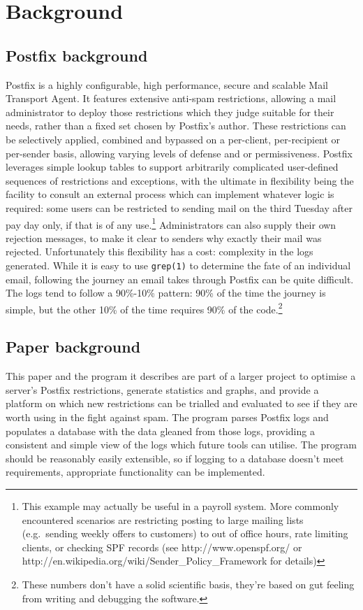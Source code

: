 \documentclass[a4paper,12pt,draft]{article}
\begin{document}
\section{Background}

\subsection{Postfix background}

Postfix is a highly configurable, high performance, secure and scalable
Mail Transport Agent.  It features extensive anti-spam restrictions,
allowing a mail administrator to deploy those restrictions which they judge
suitable for their needs, rather than a fixed set chosen by Postfix's
author.  These restrictions can be selectively applied, combined and
bypassed on a per-client, per-recipient or per-sender basis, allowing
varying levels of defense and or permissiveness.  Postfix leverages simple
lookup tables to support arbitrarily complicated user-defined sequences of
restrictions and exceptions, with the ultimate in flexibility being the
facility to consult an external process which can implement whatever logic
is required: some users can be restricted to sending mail on the third
Tuesday after pay day only, if that is of any use.\footnote{This example
may actually be useful in a payroll system.  More commonly encountered
scenarios are restricting posting to large mailing lists (e.g.\ sending
weekly offers to customers) to out of office hours, rate limiting clients,
or checking SPF records (see http://www.openspf.org/ or
http://en.wikipedia.org/wiki/Sender\_Policy\_Framework for details)}
Administrators can also supply their own rejection messages, to make it
clear to senders why exactly their mail was rejected.  Unfortunately this
flexibility has a cost: complexity in the logs generated.  While it is easy
to use \texttt{grep(1)} to determine the fate of an individual email,
following the journey an email takes through Postfix can be quite
difficult.  The logs tend to follow a 90\%-10\% pattern: 90\% of the time
the journey is simple, but the other 10\% of the time requires 90\% of the
code.\footnote{These numbers don't have a solid scientific basis, they're
based on gut feeling from writing and debugging the software.}

\subsection{Paper background}

This paper and the program it describes are part of a larger project to
optimise a server's Postfix restrictions, generate statistics and graphs,
and provide a platform on which new restrictions can be trialled and
evaluated to see if they are worth using in the fight against spam.  The
program parses Postfix logs and populates a database with the data gleaned
from those logs, providing a consistent and simple view of the logs which
future tools can utilise.  The program should be reasonably easily
extensible, so if logging to a database doesn't meet requirements,
appropriate functionality can be implemented.
\end{document}
